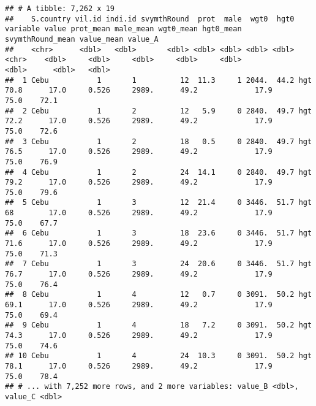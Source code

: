 \documentclass[
]{book}
\newenvironment{Shaded}{\begin{snugshade}}{\end{snugshade}}
\newcommand{\DataTypeTok}[1]{\textcolor[rgb]{0.13,0.29,0.53}{#1}}
\newcommand{\DecValTok}[1]{\textcolor[rgb]{0.00,0.00,0.81}{#1}}
\newcommand{\KeywordTok}[1]{\textcolor[rgb]{0.13,0.29,0.53}{\textbf{#1}}}
\newcommand{\NormalTok}[1]{#1}
\newcommand{\OperatorTok}[1]{\textcolor[rgb]{0.81,0.36,0.00}{\textbf{#1}}}
\begin{document}
\begin{verbatim}
## # A tibble: 7,262 x 19
##    S.country vil.id indi.id svymthRound  prot  male  wgt0  hgt0 variable value prot_mean male_mean wgt0_mean hgt0_mean svymthRound_mean value_mean value_A
##    <chr>      <dbl>   <dbl>       <dbl> <dbl> <dbl> <dbl> <dbl> <chr>    <dbl>     <dbl>     <dbl>     <dbl>     <dbl>            <dbl>      <dbl>   <dbl>
##  1 Cebu           1       1          12  11.3     1 2044.  44.2 hgt       70.8      17.0     0.526     2989.      49.2             17.9       75.0    72.1
##  2 Cebu           1       2          12   5.9     0 2840.  49.7 hgt       72.2      17.0     0.526     2989.      49.2             17.9       75.0    72.6
##  3 Cebu           1       2          18   0.5     0 2840.  49.7 hgt       76.5      17.0     0.526     2989.      49.2             17.9       75.0    76.9
##  4 Cebu           1       2          24  14.1     0 2840.  49.7 hgt       79.2      17.0     0.526     2989.      49.2             17.9       75.0    79.6
##  5 Cebu           1       3          12  21.4     0 3446.  51.7 hgt       68        17.0     0.526     2989.      49.2             17.9       75.0    67.7
##  6 Cebu           1       3          18  23.6     0 3446.  51.7 hgt       71.6      17.0     0.526     2989.      49.2             17.9       75.0    71.3
##  7 Cebu           1       3          24  20.6     0 3446.  51.7 hgt       76.7      17.0     0.526     2989.      49.2             17.9       75.0    76.4
##  8 Cebu           1       4          12   0.7     0 3091.  50.2 hgt       69.1      17.0     0.526     2989.      49.2             17.9       75.0    69.4
##  9 Cebu           1       4          18   7.2     0 3091.  50.2 hgt       74.3      17.0     0.526     2989.      49.2             17.9       75.0    74.6
## 10 Cebu           1       4          24  10.3     0 3091.  50.2 hgt       78.1      17.0     0.526     2989.      49.2             17.9       75.0    78.4
## # ... with 7,252 more rows, and 2 more variables: value_B <dbl>, value_C <dbl>
\end{verbatim}

\begin{Shaded}
\end{Shaded}
\end{document}
